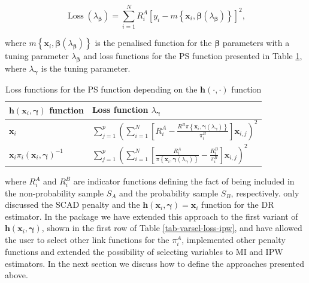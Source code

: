 \documentclass[
]{jss}
\begin{document}
\begin{equation}  
\operatorname{Loss}\left(\lambda_{\boldsymbol{\beta}}\right)=\sum_{i=1}^N R_i^A\left[y_i-m\left\{\boldsymbol{x}_i, \boldsymbol{\beta}(\lambda_{\boldsymbol{\beta}})\right\}\right]^2,
\label{eq-varsel-loss-mi}
\end{equation}

where
\(m\left\{\boldsymbol{x}_i, \boldsymbol{\beta}(\lambda_{\boldsymbol{\beta}})\right\}\)
is the penalised function for the \(\boldsymbol{\beta}\) parameters with
a tuning parameter \(\lambda_{\boldsymbol{\beta}}\) and loss functions
for the PS function presented in Table \ref{tab-varsel-loss-ipw}, where
\(\lambda_{\boldsymbol{\gamma}}\) is the tuning parameter.

\begin{table}[ht!]
\centering
\begin{tabular}{ll}
\hline
$\boldsymbol{h}(\boldsymbol{x}_i, \boldsymbol{\gamma})$ function &  Loss function $\lambda_{\boldsymbol{\gamma}}$ \\
\hline
$\boldsymbol{x}_i$ & $\sum_{j=1}^p\left(\sum_{i=1}^N\left[R_i^A - \frac{R^B\pi\left\{\boldsymbol{x}_i, \boldsymbol{\gamma}(\lambda_{\boldsymbol{\gamma}})\right\}}{\pi_i^B}\right] \boldsymbol{x}_{i, j}\right)^2$\\
\hline
$\boldsymbol{x}_i \pi_i(\boldsymbol{x}_i, \boldsymbol{\gamma})^{-1}$ & $\sum_{j=1}^p\left(\sum_{i=1}^N\left[\frac{R_i^A}{\pi\left\{\boldsymbol{x}_i, \boldsymbol{\gamma}(\lambda_{\boldsymbol{\gamma}})\right\}}-\frac{R_i^B}{\pi_i^B}\right] \boldsymbol{x}_{i, j}\right)^2$ \\
\hline
\end{tabular}
\caption{Loss functions for the PS function depending on the $\boldsymbol{h}(\cdot,\cdot)$ function}
\label{tab-varsel-loss-ipw}
\end{table}

where \(R_i^A\) and \(R_i^B\) are indicator functions defining the fact
of being included in the non-probability sample \(S_A\) and the
probability sample \(S_B\), respectively. \citet{yang_doubly_2020} only
discussed the SCAD penalty and the
\(\boldsymbol{h}(\boldsymbol{x}_i, \boldsymbol{\gamma})=\boldsymbol{x}_i\)
function for the DR estimator. In the  package we have
extended this approach to the first variant of
\(\boldsymbol{h}(\boldsymbol{x}_i, \boldsymbol{\gamma})\), shown in the
first row of Table \eqref{tab-varsel-loss-ipw}, and have allowed the
user to select other link functions for the \(\pi_i^A\), implemented
other penalty functions and extended the possibility of selecting
variables to MI and IPW estimators. In the next section we discuss how
to define the approaches presented above.
\end{document}
